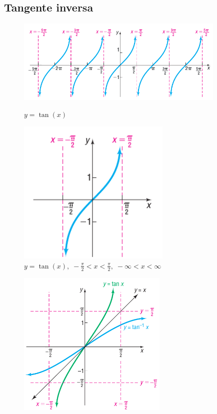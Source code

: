 \subsection{Tangente inversa}
{}
	\begin{figure}[h]
		\centering
		\includegraphics[width=10cm,keepaspectratio=true]{./trig/sull0712.png}
		\label{fig:0712}
		\caption{$y=\tan(x)$}
	\end{figure}
	

{}
	\begin{figure}[h]
		\centering
		\includegraphics[height=7cm,keepaspectratio=true]{./trig/sull0713.png}
		\caption{$y=\tan(x), \; -\frac{\pi}{2}<x<\frac{\pi}{2}, \; 
			-\infty < x < \infty$}
		\label{fig:0713}
	\end{figure}
	

{}
	\begin{figure}[h]
		\centering
		\includegraphics[height=7cm,keepaspectratio=true]{./trig/sull0714.png}
		\label{fig:0714}
	\end{figure}
	

